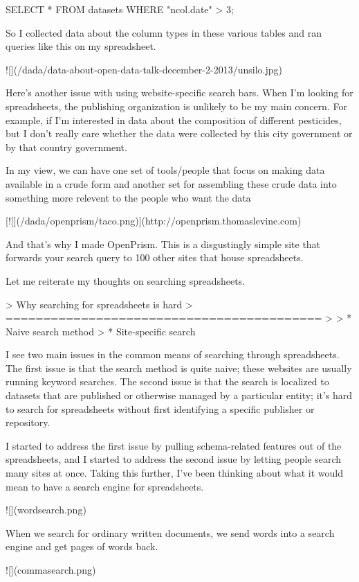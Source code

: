 \documentclass{acm_proc_article-sp}
\begin{document}
    SELECT * FROM datasets WHERE "ncol.date" > 3;

So I collected data about the column types in these various tables and ran
queries like this on my spreadsheet.

![](/dada/data-about-open-data-talk-december-2-2013/unsilo.jpg)

Here's another issue with using website-specific search bars.
When I'm looking for spreadsheets, the publishing organization is unlikely
to be my main concern. For example, if I'm interested in data about the
composition of different pesticides, but I don't really care whether the
data were collected by this city government or by that country government.

In my view, we can have one set of tools/people that focus on making
data available in a crude form and another set for assembling these crude
data into something more relevent to the people who want the data

[![](/dada/openprism/taco.png)](http://openprism.thomaslevine.com)

And that's why I made OpenPrism. This is a disgustingly simple site that
forwards your search query to 100 other sites that house spreadsheets.

Let me reiterate my thoughts on searching spreadsheets.

> Why searching for spreadsheets is hard
> ==========================================
>
> * Naive search method
> * Site-specific search

I see two main issues in the common means of searching through spreadsheets.
The first issue is that the search method is quite naive; these websites are
usually running keyword searches.
The second issue is that the search is localized to datasets that are published
or otherwise managed by a particular entity; it's hard to search for
spreadsheets without first identifying a specific publisher or repository.

I started to address the first issue by pulling schema-related features out
of the spreadsheets, and I started to address the second issue by letting
people search many sites at once. Taking this further, I've been thinking
about what it would mean to have a search engine for spreadsheets.

![](wordsearch.png)

When we search for ordinary written documents, we send words into a search
engine and get pages of words back.

![](commasearch.png)
\end{document}
